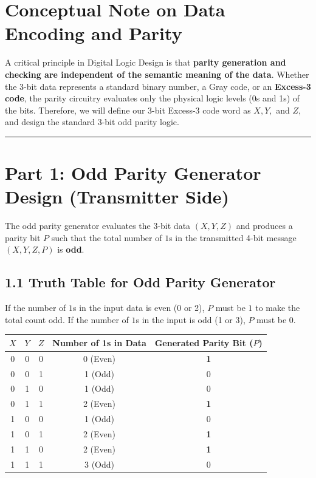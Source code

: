 \documentclass[12pt,a3paper]{article}
\begin{document}
\begin{enumerate}
\begin{tcolorbox}[enhanced,breakable,ansbox,colback=cA!4,colframe=cA,boxrule=0.8pt,arc=5pt,title={\textbf{Answer}},fonttitle=\bfseries\color{white},colbacktitle=cA]
\section*{Conceptual Note on Data Encoding and Parity}

A critical principle in Digital Logic Design is that \textbf{parity generation and checking are independent of the semantic meaning of the data}. Whether the 3-bit data represents a standard binary number, a Gray code, or an \textbf{Excess-3 code}, the parity circuitry evaluates only the physical logic levels (0s and 1s) of the bits. Therefore, we will define our 3-bit Excess-3 code word as $X, Y,$ and $Z$, and design the standard 3-bit odd parity logic.

\vspace{0.2cm}
\hrule
\vspace{0.4cm}

\section*{Part 1: Odd Parity Generator Design (Transmitter Side)}

The odd parity generator evaluates the 3-bit data $(X, Y, Z)$ and produces a parity bit $P$ such that the total number of $1$s in the transmitted 4-bit message $(X, Y, Z, P)$ is \textbf{odd}.

\subsection*{1.1 Truth Table for Odd Parity Generator}
If the number of $1$s in the input data is even (0 or 2), $P$ must be $1$ to make the total count odd. If the number of $1$s in the input is odd (1 or 3), $P$ must be $0$.

\begin{center}
\renewcommand{\arraystretch}{1.2}
\begin{tabular}{ccc|c|c}
    \toprule
    \textbf{$X$} & \textbf{$Y$} & \textbf{$Z$} & \textbf{Number of 1s in Data} & \textbf{Generated Parity Bit ($P$)} \\
    \midrule
    0 & 0 & 0 & 0 (Even) & \textcolor{cA}{\textbf{1}} \\
    0 & 0 & 1 & 1 (Odd)  & 0 \\
    0 & 1 & 0 & 1 (Odd)  & 0 \\
    0 & 1 & 1 & 2 (Even) & \textcolor{cA}{\textbf{1}} \\
    1 & 0 & 0 & 1 (Odd)  & 0 \\
    1 & 0 & 1 & 2 (Even) & \textcolor{cA}{\textbf{1}} \\
    1 & 1 & 0 & 2 (Even) & \textcolor{cA}{\textbf{1}} \\
    1 & 1 & 1 & 3 (Odd)  & 0 \\
    \bottomrule
\end{tabular}
\end{center}


\end{tcolorbox}
\end{enumerate}
\end{document}
